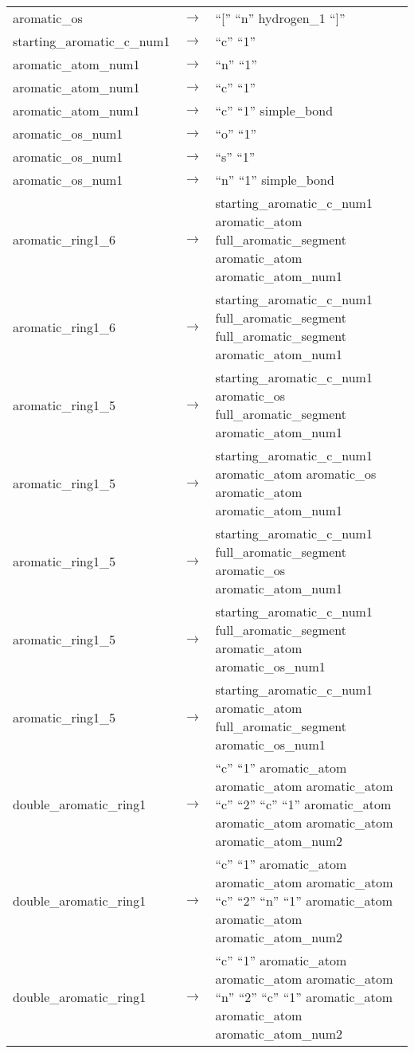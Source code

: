 \begin{longtable}{m{} p{} p{}}
    aromatic\_os & $\rightarrow$ & ``['' ``n'' hydrogen\_1 ``]'' \\
    starting\_aromatic\_c\_num1 & $\rightarrow$ & ``c'' ``1'' \\
    aromatic\_atom\_num1 & $\rightarrow$ & ``n'' ``1'' \\
    aromatic\_atom\_num1 & $\rightarrow$ & ``c'' ``1'' \\
    aromatic\_atom\_num1 & $\rightarrow$ & ``c'' ``1'' simple\_bond \\
    aromatic\_os\_num1 & $\rightarrow$ & ``o'' ``1'' \\
    aromatic\_os\_num1 & $\rightarrow$ & ``s'' ``1'' \\
    aromatic\_os\_num1 & $\rightarrow$ & ``n'' ``1'' simple\_bond \\
    aromatic\_ring1\_6 & $\rightarrow$ & starting\_aromatic\_c\_num1 aromatic\_atom full\_aromatic\_segment aromatic\_atom aromatic\_atom\_num1 \\
    aromatic\_ring1\_6 & $\rightarrow$ & starting\_aromatic\_c\_num1 full\_aromatic\_segment full\_aromatic\_segment aromatic\_atom\_num1 \\
    aromatic\_ring1\_5 & $\rightarrow$ & starting\_aromatic\_c\_num1 aromatic\_os full\_aromatic\_segment aromatic\_atom\_num1 \\
    aromatic\_ring1\_5 & $\rightarrow$ & starting\_aromatic\_c\_num1 aromatic\_atom aromatic\_os aromatic\_atom aromatic\_atom\_num1 \\
    aromatic\_ring1\_5 & $\rightarrow$ & starting\_aromatic\_c\_num1 full\_aromatic\_segment aromatic\_os aromatic\_atom\_num1 \\
    aromatic\_ring1\_5 & $\rightarrow$ & starting\_aromatic\_c\_num1 full\_aromatic\_segment aromatic\_atom aromatic\_os\_num1 \\
    aromatic\_ring1\_5 & $\rightarrow$ & starting\_aromatic\_c\_num1 aromatic\_atom full\_aromatic\_segment aromatic\_os\_num1 \\
    double\_aromatic\_ring1 & $\rightarrow$ & ``c'' ``1'' aromatic\_atom aromatic\_atom aromatic\_atom ``c'' ``2'' ``c'' ``1'' aromatic\_atom aromatic\_atom aromatic\_atom aromatic\_atom\_num2 \\
    double\_aromatic\_ring1 & $\rightarrow$ & ``c'' ``1'' aromatic\_atom aromatic\_atom aromatic\_atom ``c'' ``2'' ``n'' ``1'' aromatic\_atom aromatic\_atom aromatic\_atom\_num2 \\
    double\_aromatic\_ring1 & $\rightarrow$ & ``c'' ``1'' aromatic\_atom aromatic\_atom aromatic\_atom ``n'' ``2'' ``c'' ``1'' aromatic\_atom aromatic\_atom aromatic\_atom\_num2 \\

\end{longtable}

